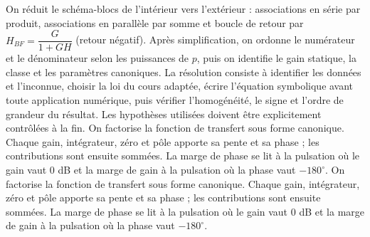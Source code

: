 \begin{corrigebox}[Corrigé]
On réduit le schéma-blocs de l'intérieur vers l'extérieur : associations en série par produit, associations en parallèle par somme et boucle de retour par $H_{BF}=\dfrac{G}{1+GH}$ (retour négatif). Après simplification, on ordonne le numérateur et le dénominateur selon les puissances de $p$, puis on identifie le gain statique, la classe et les paramètres canoniques.
La résolution consiste à identifier les données et l'inconnue, choisir la loi du cours adaptée, écrire l'équation symbolique avant toute application numérique, puis vérifier l'homogénéité, le signe et l'ordre de grandeur du résultat. Les hypothèses utilisées doivent être explicitement contrôlées à la fin.
On factorise la fonction de transfert sous forme canonique. Chaque gain, intégrateur, zéro et pôle apporte sa pente et sa phase ; les contributions sont ensuite sommées. La marge de phase se lit à la pulsation où le gain vaut $0$ dB et la marge de gain à la pulsation où la phase vaut $-180^\circ$.
On factorise la fonction de transfert sous forme canonique. Chaque gain, intégrateur, zéro et pôle apporte sa pente et sa phase ; les contributions sont ensuite sommées. La marge de phase se lit à la pulsation où le gain vaut $0$ dB et la marge de gain à la pulsation où la phase vaut $-180^\circ$.
\end{corrigebox}
